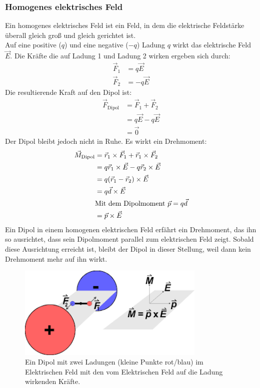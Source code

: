 \documentclass{scrartcl}
\begin{document}
\subsubsection{Homogenes elektrisches Feld}
Ein homogenes elektrisches Feld ist ein Feld, in dem die elektrische Feldstärke überall gleich groß und gleich gerichtet ist.\\
Auf eine positive ($q$) und eine negative ($-q$) Ladung $q$ wirkt das elektrische Feld $\vec{E}$.
Die Kräfte die auf Ladung 1 und Ladung 2 wirken ergeben sich durch:
\begin{align}
    \vec{F}_1&=q\vec{E}\\
    \vec{F}_2&=-q\vec{E}
\end{align}
Die resultierende Kraft auf den Dipol ist:
\begin{align}
    \vec{F}_\mathrm{Dipol}&=\vec{F}_1+\vec{F}_2\\
    &=q\vec{E}-q\vec{E}\\
    &=\vec{0}
\end{align}
Der Dipol bleibt jedoch nicht in Ruhe. Es wirkt ein Drehmoment:
\begin{align}
    \vec{M}_\mathrm{Dipol}&=\vec{r}_1\times \vec{F}_1+\vec{r}_1\times \vec{F}_2\\
    &=q\vec{r}_1\times \vec{E}-q\vec{r}_2\times\vec{E}\\
    &=q(\vec{r}_1-\vec{r}_2)\times\vec{E}\\
    &=q \vec{d}\times \vec{E}\\
    &\text{Mit dem Dipolmoment}\ \vec{p}=q\vec{d}\notag\\
    &=\vec{p}\times \vec{E}
\end{align}
Ein Dipol in einem homogenen elektrischen Feld erfährt ein Drehmoment,
das ihn so ausrichtet, dass sein Dipolmoment parallel zum elektrischen Feld zeigt.
Sobald diese Ausrichtung erreicht ist, bleibt der Dipol in dieser Stellung,
weil dann kein Drehmoment mehr auf ihn wirkt.
\begin{figure}[H]
    \centering
    \includegraphics[width=0.80\textwidth]{Dipol im elektrischen Feld.png}
    \caption{Ein Dipol mit zwei Ladungen (kleine Punkte rot/blau) im Elektrischen Feld mit den vom Elektrischen Feld auf die Ladung wirkenden Kräfte.}
\end{figure}
\end{document}
